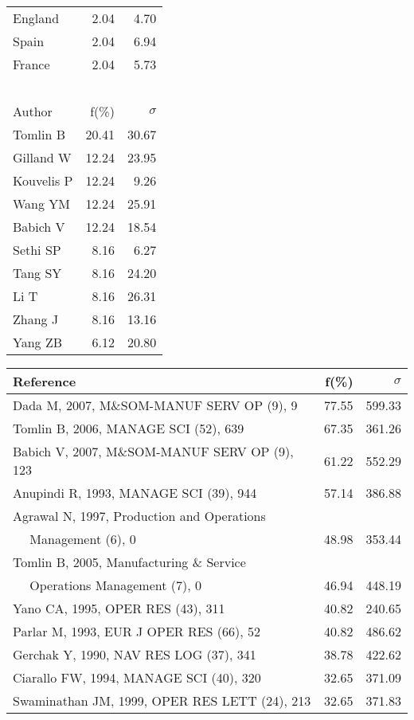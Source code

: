 \documentclass[a4paper,11pt]{report}
\begin{document}
\begin{landscape}
\begin{table}[!ht]
{\begin{tabular}{|l r r|}
England & 2.04 & 4.70\\
Spain & 2.04 & 6.94\\
France & 2.04 & 5.73\\
 &  & \\
 &  & \\
 &  & \\
 &  & \\
 &  & \\
\hline
\hline
Author & f(\%) & $\sigma$\\
\hline
Tomlin B & 20.41 & 30.67\\
Gilland W & 12.24 & 23.95\\
Kouvelis P & 12.24 & 9.26\\
Wang YM & 12.24 & 25.91\\
Babich V & 12.24 & 18.54\\
Sethi SP & 8.16 & 6.27\\
Tang SY & 8.16 & 24.20\\
Li T & 8.16 & 26.31\\
Zhang J & 8.16 & 13.16\\
Yang ZB & 6.12 & 20.80\\
\hline
\end{tabular}
}
{\scriptsize\begin{tabular}{|l r r|}
\hline
Reference & f(\%) & $\sigma$\\
\hline
Dada M, 2007, M\&SOM-MANUF SERV OP (9), 9 & 77.55 & 599.33\\
Tomlin B, 2006, MANAGE SCI (52), 639 & 67.35 & 361.26\\
Babich V, 2007, M\&SOM-MANUF SERV OP (9), 123 & 61.22 & 552.29\\
Anupindi R, 1993, MANAGE SCI (39), 944 & 57.14 & 386.88\\
Agrawal N, 1997, Production and Operations &  & \\
$\quad$ Management (6), 0 & 48.98 & 353.44\\
Tomlin B, 2005, Manufacturing \& Service &  & \\
$\quad$ Operations Management (7), 0 & 46.94 & 448.19\\
Yano CA, 1995, OPER RES (43), 311 & 40.82 & 240.65\\
Parlar M, 1993, EUR J OPER RES (66), 52 & 40.82 & 486.62\\
Gerchak Y, 1990, NAV RES LOG (37), 341 & 38.78 & 422.62\\
Ciarallo FW, 1994, MANAGE SCI (40), 320 & 32.65 & 371.09\\
Swaminathan JM, 1999, OPER RES LETT (24), 213 & 32.65 & 371.83\\

\end{tabular}}
\end{table}
\end{landscape}
\end{document}
